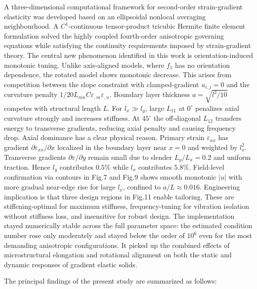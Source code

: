 \documentclass[final,3p,times,fleqn]{elsarticle}
\newcommand{\rev}[1]{\textcolor{revcolor}{#1}}
\begin{document}
A three-dimensional computational framework for second-order
strain-gradient elasticity was developed based on an ellipsoidal
nonlocal averaging neighbourhood. A $C^{1}$-continuous tensor-product tricubic Hermite
finite element formulation solved the highly coupled fourth-order
anisotropic governing equations while satisfying the continuity
requirements imposed by strain-gradient theory.
\rev{The central new phenomenon identified in this work is orientation-induced monotonic tuning. Unlike axis-aligned models, where $f_1$ has no orientation dependence, the rotated model shows monotonic decrease. This arises from competition between the slope constraint with clamped-gradient $u_{i,j}=0$ and the curvature penalty $1/20 L_{mn}C\varepsilon_{,m}\varepsilon_{,n}$. Boundary layer thickness $a=\sqrt{l^2/10}$ competes with structural length $L$. For $l_x\gg l_y$, large $L_{11}$ at $0^\circ$ penalizes axial curvature strongly and increases stiffness. At $45^\circ$ the off-diagonal $L_{12}$ transfers energy to transverse gradients, reducing axial penalty and causing frequency drop. Axial dominance has a clear physical reason. Primary strain $\varepsilon_{xx}$ has gradient $\partial\varepsilon_{xx}/\partial x$ localized in the boundary layer near $x=0$ and weighted by $l_x^2$. Transverse gradients $\partial\varepsilon/\partial y$ remain small due to slender $L_y/L_x=0.2$ and uniform traction. Hence $l_y$ contributes $0.5\%$ while $l_x$ contributes $5.8\%$. Field-level confirmation via contours in Fig.7 and Fig.9 shows smooth monotonic $|u|$ with more gradual near-edge rise for large $l_x$, confined to $a/L\approx0.016$. Engineering implication is that three design regions in Fig.11 enable tailoring. These are stiffening-optimal for maximum stiffness, frequency-tuning for vibration isolation without stiffness loss, and insensitive for robust design.} The implementation stayed numerically
stable across the full parameter space: the estimated condition number
rose only moderately and stayed below the order of $10^{6}$ even for the
most demanding anisotropic configurations. It picked up the combined
effects of microstructural elongation and rotational alignment on both
the static and dynamic responses of gradient elastic solids.

The principal findings of the present study are summarized as follows:
\end{document}
